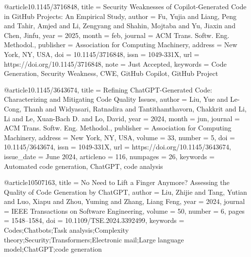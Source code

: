 @article{10.1145/3716848,
title = {Security Weaknesses of Copilot-Generated Code in GitHub Projects: An Empirical Study},
author = {Fu, Yujia and Liang, Peng and Tahir, Amjed and Li, Zengyang and Shahin, Mojtaba and Yu, Jiaxin and Chen, Jinfu},
year = 2025,
month = {feb},
journal = {ACM Trans. Softw. Eng. Methodol.},
publisher = {Association for Computing Machinery},
address = {New York, NY, USA},
doi = {10.1145/3716848},
issn = {1049-331X},
url = {https://doi.org/10.1145/3716848},
note = {Just Accepted},
keywords = {Code Generation, Security Weakness, CWE, GitHub Copilot, GitHub Project}
}

@article{10.1145/3643674,
title = {Refining ChatGPT-Generated Code: Characterizing and Mitigating Code Quality Issues},
author = {Liu, Yue and Le-Cong, Thanh and Widyasari, Ratnadira and Tantithamthavorn, Chakkrit and Li, Li and Le, Xuan-Bach D. and Lo, David},
year = 2024,
month = {jun},
journal = {ACM Trans. Softw. Eng. Methodol.},
publisher = {Association for Computing Machinery},
address = {New York, NY, USA},
volume = 33,
number = 5,
doi = {10.1145/3643674},
issn = {1049-331X},
url = {https://doi.org/10.1145/3643674},
issue_date = {June 2024},
articleno = 116,
numpages = 26,
keywords = {Automated code generation, ChatGPT, code analysis}
}

@article{10507163,
title = {No Need to Lift a Finger Anymore? Assessing the Quality of Code Generation by ChatGPT},
author = {Liu, Zhijie and Tang, Yutian and Luo, Xiapu and Zhou, Yuming and Zhang, Liang Feng},
year = 2024,
journal = {IEEE Transactions on Software Engineering},
volume = 50,
number = 6,
pages = {1548--1584},
doi = {10.1109/TSE.2024.3392499},
keywords = {Codes;Chatbots;Task analysis;Complexity theory;Security;Transformers;Electronic mail;Large language model;ChatGPT;code generation}
}

